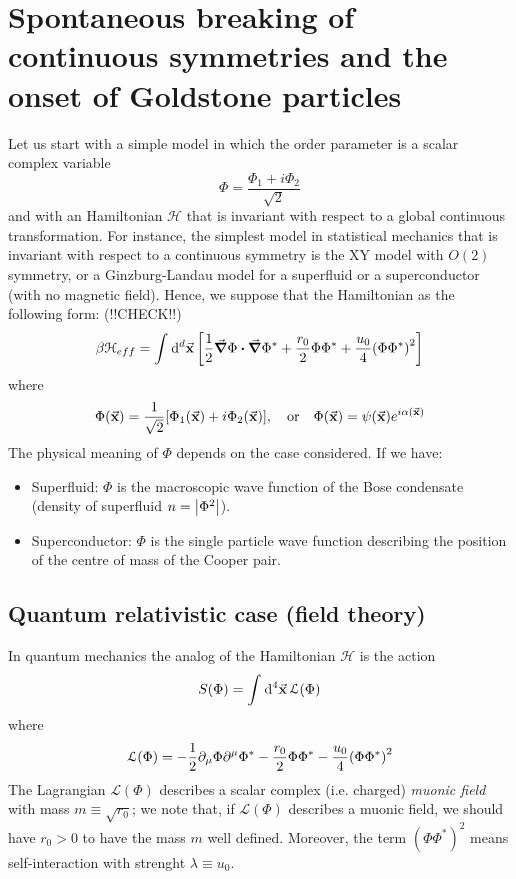 \documentclass[../../Main/Main.tex]{subfiles}
\begin{document}
\section{Spontaneous breaking of continuous symmetries and the onset of Goldstone particles}
Let us start with a simple model in which the order parameter is a scalar complex variable
\begin{equation*}
  \Phi = \frac{\Phi _1 + i \Phi _2}{\sqrt{2} }
\end{equation*}
and with an Hamiltonian \( \mathcal{H} \) that is invariant with respect to a global continuous transformation. For instance, the simplest model in statistical mechanics that is invariant with respect to a continuous symmetry is the XY model with \( O(2) \) symmetry, or a Ginzburg-Landau model for a superfluid or a superconductor (with no magnetic field). Hence, we suppose that the Hamiltonian as the following form: (!!CHECK!!)
\begin{equation*}
  \beta \mathcal{H}_{eff} = \int_{}^{} \dd[d]{\va{x}} \qty[ \frac{1}{2} \va{\grad }\Phi \vdot \va{\grad } \Phi ^* + \frac{r_0}{2} \Phi  \Phi^* + \frac{u_0}{4} \qty(\Phi \Phi^* )^2 ]
\end{equation*}
where
\begin{equation*}
  \Phi (\va{x}) = \frac{1}{\sqrt{2} } \qty[ \Phi _1 (\va{x}) + i \Phi _2 (\va{x})], \quad \text{or} \quad \Phi (\va{x}) = \psi (\va{x}) e^{i \alpha (\va{x})}
\end{equation*}
The physical meaning of \( \Phi  \) depends on the case considered. If we have:

\begin{itemize}
\item Superfluid: \( \Phi  \) is the macroscopic wave function of the Bose condensate (density of superfluid \( n= \abs{\Phi ^2}  \)).
\item Superconductor: \( \Phi  \) is the single particle wave function describing the position of the centre of mass of the Cooper pair.
\end{itemize}

\subsection{Quantum relativistic case (field theory)}
In quantum mechanics the analog of the Hamiltonian \( \mathcal{H} \) is the action
\begin{equation}
  S(\Phi ) = \int_{}^{} \dd[4]{\va{x}}   \mathcal{L} ( \Phi )
\end{equation}
where
\begin{equation}
  \mathcal{L} (\Phi ) = - \frac{1}{2} \partial_\mu \Phi \partial^\mu \Phi ^*
  - \frac{r_0}{2} \Phi \Phi ^* - \frac{u_0}{4} \qty(\Phi \Phi ^*)^2
  \label{eq:n_8}
\end{equation}
The Lagrangian \( \mathcal{L} (\Phi ) \) describes a scalar complex (i.e. charged) \emph{muonic field} with mass \( m \equiv \sqrt{r_0} \); we note that, if  \( \mathcal{L} (\Phi ) \) describes a muonic field, we should have \( r_0>0 \) to have the mass \( m \) well defined. Moreover, the term \( (\Phi \Phi ^*)^2 \) means self-interaction with strenght \( \lambda \equiv u_0 \).
\end{document}

